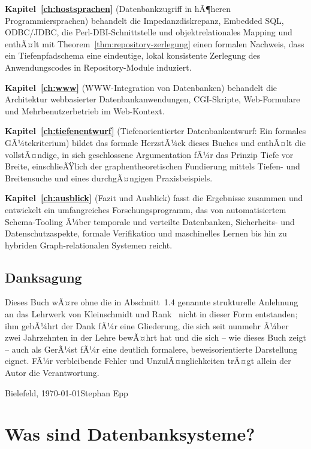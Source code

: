 ﻿\documentclass[a4paper,12pt]{report}
\theoremstyle{definition}
\theoremstyle{remark}
\begin{document}
\textbf{Kapitel~\ref{ch:hostsprachen}} (\glqq Datenbankzugriff in
hÃ¶heren Programmiersprachen\grqq{}) behandelt die
Impedanzdiskrepanz, Embedded SQL, ODBC/JDBC, die Perl-DBI-Schnittstelle
und objektrelationales Mapping und enthÃ¤lt mit
Theorem~\ref{thm:repository-zerlegung} einen formalen Nachweis, dass
ein Tiefenpfadschema eine eindeutige, lokal konsistente Zerlegung des
Anwendungscodes in Repository-Module induziert.

\textbf{Kapitel~\ref{ch:www}} (\glqq WWW-Integration von
Datenbanken\grqq{}) behandelt die Architektur webbasierter
Datenbankanwendungen, CGI-Skripte, Web-Formulare und
Mehrbenutzerbetrieb im Web-Kontext.

\textbf{Kapitel~\ref{ch:tiefenentwurf}} (\glqq Tiefenorientierter
Datenbankentwurf: Ein formales GÃ¼tekriterium\grqq{}) bildet das
formale HerzstÃ¼ck dieses Buches und enthÃ¤lt die vollstÃ¤ndige,
in sich geschlossene Argumentation fÃ¼r das Prinzip
\glqq Tiefe vor Breite\grqq{}, einschlieÃŸlich der
graphentheoretischen Fundierung mittels Tiefen- und Breitensuche und
eines durchgÃ¤ngigen Praxisbeispiels.

\textbf{Kapitel~\ref{ch:ausblick}} (\glqq Fazit und Ausblick\grqq{})
fasst die Ergebnisse zusammen und entwickelt ein umfangreiches
Forschungsprogramm, das von automatisiertem Schema-Tooling Ã¼ber
temporale und verteilte Datenbanken, Sicherheits- und
Datenschutzaspekte, formale Verifikation und maschinelles Lernen bis
hin zu hybriden Graph-relationalen Systemen reicht.

\section*{Danksagung}

Dieses Buch wÃ¤re ohne die in Abschnitt~1.4 genannte strukturelle
Anlehnung an das Lehrwerk von Kleinschmidt und
Rank~\cite{Kleinschmidt2002} nicht in dieser Form entstanden; ihm
gebÃ¼hrt der Dank fÃ¼r eine Gliederung, die sich seit nunmehr Ã¼ber zwei
Jahrzehnten in der Lehre bewÃ¤hrt hat und die sich -- wie dieses Buch
zeigt -- auch als GerÃ¼st fÃ¼r eine deutlich formalere, beweisorientierte
Darstellung eignet. FÃ¼r verbleibende Fehler und UnzulÃ¤nglichkeiten
trÃ¤gt allein der Autor die Verantwortung.

\bigskip
\noindent Bielefeld, \today \hfill Stephan Epp

\chapter{Was sind Datenbanksysteme?}
\label{ch:einleitung}
\end{document}
